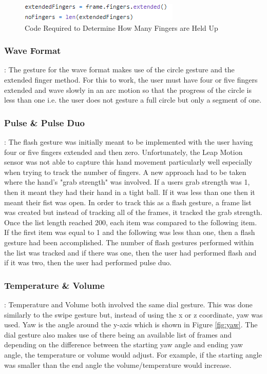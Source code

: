 \documentclass{l4proj}
\begin{document}
\begin{figure}[!htb]
    \centering
    \includegraphics[scale = 0.9]{images/extendedFingers.png}
    \caption{Code Required to Determine How Many Fingers are Held Up}
    \label{fig:extendedFingers}
\end{figure}

\subsubsection{Wave Format}: The gesture for the wave format makes use of the circle gesture and the extended finger method. For this to work, the user must have four or five fingers extended and wave slowly in an arc motion so that the progress of the circle is less than one i.e. the user does not gesture a full circle but only a segment of one.  

\subsubsection{Pulse \& Pulse Duo}: The flash gesture was initially meant to be implemented with the user having four or five fingers extended and then zero. Unfortunately, the Leap Motion sensor was not able to capture this hand movement particularly well especially when trying to track the number of fingers. A new approach had to be taken where the hand's "grab strength" was involved. If a users grab strength was 1, then it meant they had their hand in a tight ball. If it was less than one then it meant their fist was open. In order to track this as a flash gesture, a frame list was created but instead of tracking all of the frames, it tracked the grab strength. Once the list length reached 200, each item was compared to the following item. If the first item was equal to 1 and the following was less than one, then a flash gesture had been accomplished. The number of flash gestures performed within the list was tracked and if there was one, then the user had performed flash and if it was two, then the user had performed pulse duo. 

\subsubsection{Temperature \& Volume}: Temperature and Volume both involved the same dial gesture. This was done similarly to the swipe gesture but, instead of using the x or z coordinate, yaw was used. Yaw is the angle around the y-axis which is shown in Figure \ref{fig:yaw}. The dial gesture also makes use of there being an available list of frames and depending on the difference between the starting yaw angle and ending yaw angle, the temperature or volume would adjust. For example, if the starting angle was smaller than the end angle the volume/temperature would increase.
\end{document}
